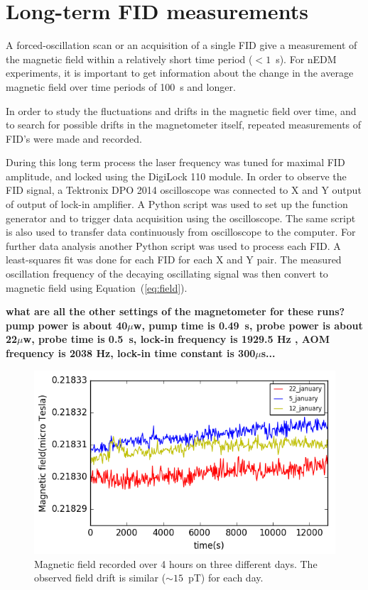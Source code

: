 \section{Long-term FID measurements}

A forced-oscillation scan or an acquisition of a single FID give a
measurement of the magnetic field within a relatively short time
period ($<1$~s).  For nEDM experiments, it is important to get
information about the change in the average magnetic field over time
periods of 100~s and longer.

In order to study the fluctuations and drifts in the magnetic field
over time, and to search for possible drifts in the magnetometer
itself, repeated measurements of FID's were made and recorded.

During this long term process the laser frequency was tuned for
maximal FID amplitude, and locked using the DigiLock 110 module.  In
order to observe the FID signal, a Tektronix DPO 2014 oscilloscope was
connected to X and Y output of output of lock-in amplifier. A Python
script was used to set up the function generator and to trigger data
acquisition using the oscilloscope. The same script is also used to
transfer data continuously from oscilloscope to the computer.  For
further data analysis another Python script was used to process each
FID.  A least-squares fit was done for each FID for each X and Y pair.
The measured oscillation frequency of the decaying oscillating signal
was then convert to magnetic field using Equation~(\ref{eq:field}).

{\bf what are all the other settings of the magnetometer for these
  runs?  pump power is about 40$\mu$w,  pump time is 0.49~s,  probe power is about 22$\mu$w,  probe time is 0.5~s,  lock-in
  frequency is 1929.5 Hz , AOM frequency is 2038 Hz, lock-in time constant is 300$\mu$s...}

\begin{figure}%
\centering\includegraphics[width=0.85\linewidth]{figures/field_3_day}
\caption{Magnetic field recorded over 4 hours on three different
  days. The observed field drift is similar ($\sim 15$~pT) for each
  day.\label{fig:long-term-field}}
\end{figure}

